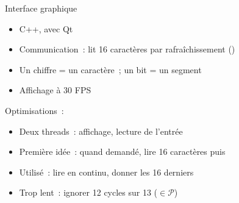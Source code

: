 \documentclass[11pt]{beamer}
\begin{document}
\begin{frame}{Interface graphique}
\begin{itemize}
\item C++, avec Qt
\item Communication~: lit 16 caractères par rafraîchissement ()
\item Un chiffre = un caractère~; un bit = un segment
\item Affichage à 30 FPS
\end{itemize}

\noindent Optimisations~:
\begin{itemize}
\item \alert{Deux threads}~: affichage, lecture de l'entrée
\item Première idée~: quand demandé, lire 16 caractères puis 
\item Utilisé~: lire en continu, donner les 16 derniers
\item Trop lent~: ignorer \alert{12 cycles sur 13} ($\in \mathcal{P}$)
\end{itemize}
\end{frame}
\end{document}
